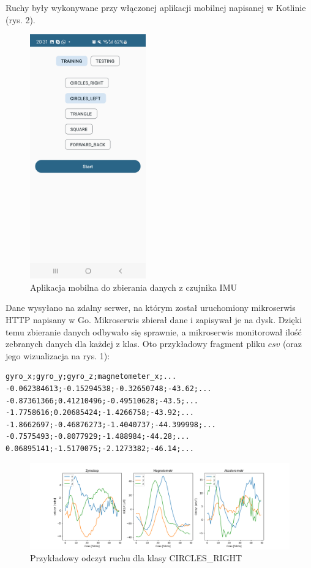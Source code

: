 \documentclass[10pt]{article}
\begin{document}
Ruchy były wykonywane przy włączonej aplikacji mobilnej napisanej w Kotlinie (rys. 2).

\begin{figure}[h]
\label{fig:screenshot}
\includegraphics[width=5cm]{s1.jpg}
\centering
\caption{Aplikacja mobilna do zbierania danych z czujnika IMU}
\end{figure}

Dane wysyłano na zdalny serwer, na którym został uruchomiony mikroserwis HTTP napisany w Go. Mikroserwis zbierał dane i zapisywał je na dysk. Dzięki temu zbieranie danych odbywało się sprawnie, a mikroserwis monitorował ilość zebranych danych dla każdej z klas. Oto przykładowy fragment pliku $csv$ (oraz jego wizualizacja na rys. 1):

\begin{verbatim}  
gyro_x;gyro_y;gyro_z;magnetometer_x;...
-0.062384613;-0.15294538;-0.32650748;-43.62;...
-0.87361366;0.41210496;-0.49510628;-43.5;...
-1.7758616;0.20685424;-1.4266758;-43.92;...
-1.8662697;-0.46876273;-1.4040737;-44.399998;...
-0.7575493;-0.8077929;-1.488984;-44.28;...
0.06895141;-1.5170075;-2.1273382;-46.14;...
\end{verbatim}


\begin{figure}[H]
  \includegraphics[width=16cm]{sample.png}
  \centering
  \caption{Przykładowy odczyt ruchu dla klasy CIRCLES\_RIGHT}
\end{figure}
\end{document}
